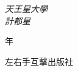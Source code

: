 \begin{titlepage}
  \vspace{0.5\baselineskip} %

  \textit{天王星大學\\ 計都星} %

  \vfill %


  \plogo %

  \vspace{0.3\baselineskip} %

  \kansuji\year 年 %

  {\large 左右手互擊出版社} %

\end{titlepage}



